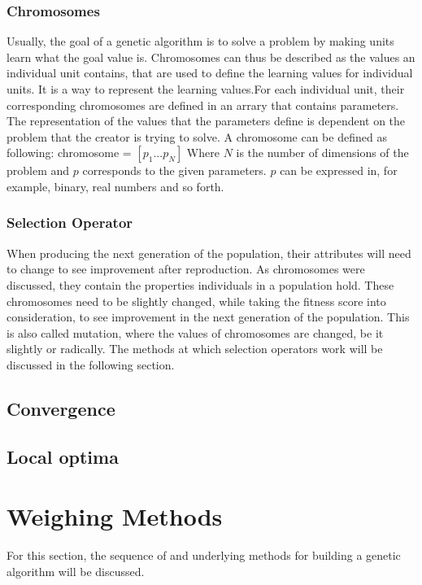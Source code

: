 \documentclass{article}
\begin{document}
\subsubsection{Chromosomes}
Usually, the goal of a genetic algorithm is to solve a problem by making units learn what the goal value is. Chromosomes can thus be described as the values an individual unit contains, that are used to define the learning values for individual units. It is a way to represent the learning values.\smallbreak For each individual unit, their corresponding chromosomes are defined in an arrary that contains parameters. The representation of the values that the parameters define is dependent on the problem that the creator is trying to solve. A chromosome can be defined as following:\bigbreak
chromosome = $\left[ p_{1} ... p_{N} \right]$\bigbreak
Where $N$ is the number of dimensions of the problem and $p$ corresponds to the given parameters. $p$ can be expressed in, for example, binary, real numbers and so forth.

\bigbreak
\subsubsection{Selection Operator}
When producing the next generation of the population, their attributes will need to change to see improvement after reproduction. As chromosomes were discussed, they contain the properties individuals in a population hold. These chromosomes need to be slightly changed, while taking the fitness score into consideration, to see improvement in the next generation of the population. This is also called mutation, where the values of chromosomes are changed, be it slightly or radically. The methods at which selection operators work will be discussed in the following section.

\bigskip
\subsection{Convergence}

\bigskip
\subsection{Local optima}

\newpage
\section{Weighing Methods}
For this section, the sequence of and underlying methods for building a genetic algorithm will be discussed. 
\bigskip
\end{document}
